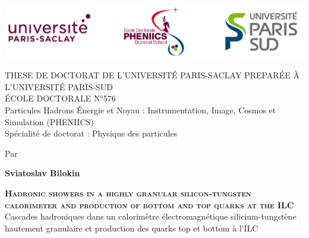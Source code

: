 \documentclass[12pt]{article}
\begin{document}

\usetikzlibrary{calc}
\thispagestyle{empty}


{\begin{center}
	\vspace{-3.5cm}
	\includegraphics[width=14cm]{Logo_ALL.png}\\
	\vspace{1cm}
	
	\textcolor{violet!80!red!80!black}{{{\uppercase{ These de Doctorat de L'Universit\'{e} Paris-Saclay Prepar\'{e}e \`{a} l'Universit\'{e} Paris-Sud}}}}\\
	\vspace{1cm}
	\'{E}COLE DOCTORALE N°576\\
	Particules Hadrons \'{E}nergie et Noyau : Instrumentation, Image, Cosmos et Simulation (PHENIICS)\\
	Sp\'{e}cialit\'{e} de doctorat : Physique des particules\par
	\vspace{0.5cm}
 	Par\par  \large \textbf{Sviatoslav Bilokin} \par
	\vspace{0.5cm}
	\Large \textsc{\textcolor{SchoolColor}{
	\textbf{Hadronic showers in a highly granular silicon-tungsten calorimeter and production of bottom and top quarks at the ILC}}}\\
	{ \normalsize Cascades hadroniques dans un calorim\`etre \'electromagn\'etique silicium-tungst\`ene hautement granulaire et production des quarks top et bottom \`a l'ILC}%
\end{center}

\vspace{0.3cm}

\vspace{0.3cm}
\hspace{-1cm}{  Composition de jury: \par}

}
\end{document}
